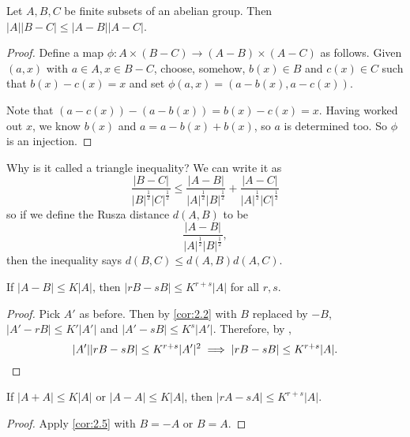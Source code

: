 \documentclass{article}
\newcommand{\1}[1]{\mathbbm{1}_{#1}}
\begin{document}
\begin{nlemma}\label{lem:2.4}
  Let $A,B,C$ be finite subsets of an abelian group.
  Then $|A||B-C| \leq |A-B||A-C|$.
\end{nlemma}
\begin{proof}
  Define a map $\phi: A \times (B-C) \to (A-B) \times (A-C)$ as follows.
  Given $(a,x)$ with $a\in A, x \in B-C$, choose, somehow, $b(x) \in B$ and $c(x) \in C$ such that $b(x) - c(x) = x$ and set $\phi(a,x) = (a - b(x), a-c(x))$.

  Note that $(a - c(x)) - (a - b(x)) = b(x) - c(x) = x$.
  Having worked out $x$, we know $b(x)$ and $a = a - b(x) + b(x)$, so $a$ is determined too.
  So $\phi$ is an injection.
\end{proof}

Why is it called a triangle inequality?
We can write it as
\begin{equation*}
  \frac{|B-C|}{|B|^{\frac{1}{2}} |C|^{\frac{1}{2}}} \leq \frac{|A-B|}{|A|^{\frac{1}{2}} |B|^{\frac{1}{2}}} + \frac{|A-C|}{|A|^{\frac{1}{2}} |C|^{\frac{1}{2}}}
\end{equation*}
so if we define the Rusza distance $d(A,B)$ to be
\begin{equation*}
  \frac{|A-B|}{|A|^{\frac{1}{2}} |B|^{\frac{1}{2}}},
\end{equation*}
then the inequality says $d(B,C) \leq d(A,B) d(A,C)$.

\begin{ncor}\label{cor:2.5}
  If $|A - B| \leq K|A|$, then $|rB - sB| \leq K^{r+s}|A|$ for all $r,s$.
\end{ncor}
\begin{proof}
  Pick $A'$ as before. Then by \cref{cor:2.2} with $B$ replaced by $-B$, $|A'-rB| \leq K'|A'|$ and $|A' - sB| \leq K^s |A'|$.
  Therefore, by ,
  \begin{equation*}
    |A'| |rB - sB| \leq K^{r+s} |A'|^2 \implies |rB - sB| \leq K^{r+s} |A|. \qedhere
  \end{equation*}
\end{proof}

\begin{ncor}\label{cor:2.6}
  If $|A+A| \leq K|A|$ or $|A-A| \leq K|A|$, then $|rA-sA| \leq K^{r+s}|A|$.
\end{ncor}
\begin{proof}
  Apply \cref{cor:2.5} with $B=-A$ or $B=A$.
\end{proof}
\end{document}
